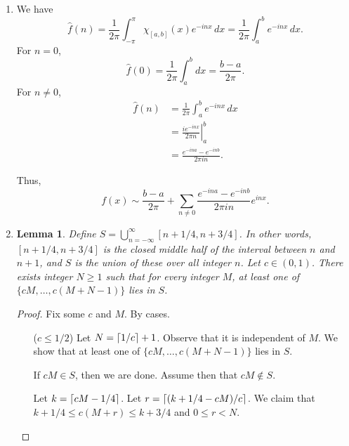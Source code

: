 \documentclass[oneside]{article}
\DeclarePairedDelimiter\ceil{\lceil}{\rceil}
\newtheorem*{lem}{Lemma}
\begin{document}
  \begin{enumerate}[label=(\alph*)]
    \item We have \[
      \hat f(n)
      = \frac{1}{2\pi}\int_{-\pi}^\pi \chi_{[a,b]}(x)e^{-inx}\,dx
      = \frac{1}{2\pi}\int_a^b e^{-inx}\,dx \text{.}
    \] For $n=0$, \[
      \hat f(0) = \frac{1}{2\pi}\int_a^b dx = \frac{b-a}{2\pi}\text{.}
    \] For $n\neq0$,\begin{align*}
      \hat f(n)
      &= \frac{1}{2\pi}\int_a^b e^{-inx}\,dx \\
      &= \left.\frac{ie^{-inx}}{2\pi n}\right|_a^b \\
      &= \frac{e^{-ina}-e^{-inb}}{2\pi in} \text{.}
    \end{align*}

    Thus,\[
      f(x)
      \sim \frac{b-a}{2\pi}
      + \sum_{n\neq0}\frac{e^{-ina}-e^{-inb}}{2\pi in}e^{inx}\text{.}
    \]

    \item \begin{lem}Define $S = \bigcup_{n=-\infty}^\infty [n + 1/4, n + 3/4]$. In
    other words, $[n + 1/4, n + 3/4]$ is the closed middle half of the interval
    between $n$ and $n+1$, and $S$ is the union of these over all integer $n$.
    Let $c \in (0, 1)$. There exists integer $N \geq 1$ such that for every
    integer $M$, at least one of $\{cM, \dots, c(M+N-1)\}$ lies in $S$.
    \end{lem}
    \begin{proof}
      Fix some $c$ and $M$. By cases.
      \begin{itemize}[leftmargin=45pt]
        \item[($c \leq 1/2$)] Let $N = \ceil{1/c} + 1$. Observe that it is
        independent of $M$. We show that at least one of
        $\{cM, \dots, c(M+N-1)\}$ lies in $S$.

        If $cM \in S$, then we are done. Assume then that $cM \notin S$.

        Let $k = \ceil{cM - 1/4}$. Let $r = \ceil{(k + 1/4 - cM)/c}$. We
        claim that $k + 1/4 \leq c(M+r) \leq k + 3/4$ and $0 \leq r < N$.


\end{itemize}
\end{proof}
\end{enumerate}
\end{document}
